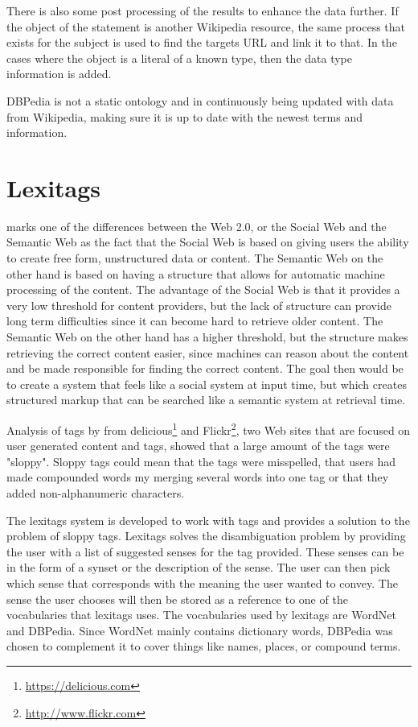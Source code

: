 There is also some post processing of the results to enhance the data further.
If the object of the statement is another Wikipedia resource,
the same process that exists for the subject is used to find the targets URL and link it to that.
In the cases where the object is a literal of a known type, then the data type information is added.

DBPedia is not a static ontology and in continuously being updated with data from Wikipedia,
making sure it is up to date with the newest terms and information.



\section{Lexitags}
\label{Lexitags}
\citet{Veres2011} marks one of the differences between the Web 2.0, or the Social Web and the Semantic Web as the
fact that the Social Web is based on giving users the ability to create free form, unstructured data or content.
The Semantic Web on the other hand is based on having a structure that allows for automatic machine processing of the content.
The advantage of the Social Web is that it provides a very low threshold for content providers,
but the lack of structure can provide long term difficulties since it can become hard to retrieve older content.
The Semantic Web on the other hand has a higher threshold,
but the structure makes retrieving the correct content easier,
since machines can reason about the content and be made responsible for finding the correct content.
The goal then would be to create a system that feels like a social system at input time,
but which creates structured markup that can be searched like a semantic system at retrieval time.

Analysis of tags by \citet{Tonkin2006} from delicious\footnote{\url{https://delicious.com}} and Flickr\footnote{\url{http://www.flickr.com}},
two Web sites that are focused on user generated content and tags,
showed that a large amount of the tags were "sloppy".
Sloppy tags could mean that the tags were misspelled,
that users had made compounded words my merging several words into one tag
or that they added non-alphanumeric characters.

The lexitags system is developed to work with tags and provides a solution to the problem of sloppy tags.
Lexitags solves the disambiguation problem by providing the user with a list of suggested senses for the tag provided.
These senses can be in the form of a synset or the description of the sense.
The user can then pick which sense that corresponds with the meaning the user wanted to convey\citep{Veres2011}.
The sense the user chooses will then be stored as a reference to one of the vocabularies that lexitags uses.
The vocabularies used by lexitags are WordNet and DBPedia.
Since WordNet mainly contains dictionary words,
DBPedia was chosen to complement it to cover things like names, places, or compound terms.

